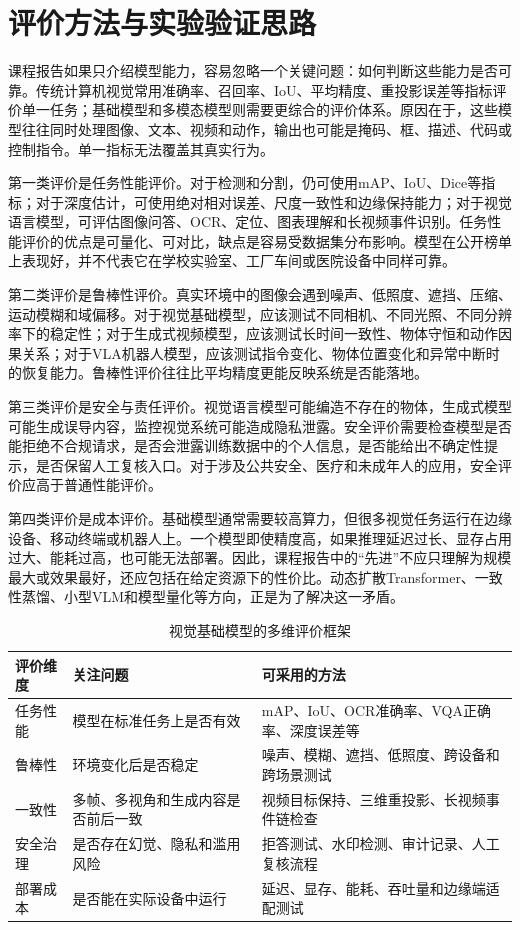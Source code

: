 \documentclass[UTF8,a4paper,12pt]{ctexart}
\begin{document}
\section{评价方法与实验验证思路}
课程报告如果只介绍模型能力，容易忽略一个关键问题：如何判断这些能力是否可靠。传统计算机视觉常用准确率、召回率、IoU、平均精度、重投影误差等指标评价单一任务；基础模型和多模态模型则需要更综合的评价体系。原因在于，这些模型往往同时处理图像、文本、视频和动作，输出也可能是掩码、框、描述、代码或控制指令。单一指标无法覆盖其真实行为。

第一类评价是任务性能评价。对于检测和分割，仍可使用mAP、IoU、Dice等指标；对于深度估计，可使用绝对相对误差、尺度一致性和边缘保持能力；对于视觉语言模型，可评估图像问答、OCR、定位、图表理解和长视频事件识别。任务性能评价的优点是可量化、可对比，缺点是容易受数据集分布影响。模型在公开榜单上表现好，并不代表它在学校实验室、工厂车间或医院设备中同样可靠。

第二类评价是鲁棒性评价。真实环境中的图像会遇到噪声、低照度、遮挡、压缩、运动模糊和域偏移。对于视觉基础模型，应该测试不同相机、不同光照、不同分辨率下的稳定性；对于生成式视频模型，应该测试长时间一致性、物体守恒和动作因果关系；对于VLA机器人模型，应该测试指令变化、物体位置变化和异常中断时的恢复能力。鲁棒性评价往往比平均精度更能反映系统是否能落地。

第三类评价是安全与责任评价。视觉语言模型可能编造不存在的物体，生成式模型可能生成误导内容，监控视觉系统可能造成隐私泄露。安全评价需要检查模型是否能拒绝不合规请求，是否会泄露训练数据中的个人信息，是否能给出不确定性提示，是否保留人工复核入口。对于涉及公共安全、医疗和未成年人的应用，安全评价应高于普通性能评价。

第四类评价是成本评价。基础模型通常需要较高算力，但很多视觉任务运行在边缘设备、移动终端或机器人上。一个模型即使精度高，如果推理延迟过长、显存占用过大、能耗过高，也可能无法部署。因此，课程报告中的“先进”不应只理解为规模最大或效果最好，还应包括在给定资源下的性价比。动态扩散Transformer、一致性蒸馏、小型VLM和模型量化等方向，正是为了解决这一矛盾。

\begin{table}[htbp]
\centering
\small
\caption{视觉基础模型的多维评价框架}
\begin{tabularx}{\textwidth}{C{2.5cm}Y Y}
\toprule
\textbf{评价维度} & \textbf{关注问题} & \textbf{可采用的方法} \\
\midrule
任务性能 & 模型在标准任务上是否有效 & mAP、IoU、OCR准确率、VQA正确率、深度误差等 \\
鲁棒性 & 环境变化后是否稳定 & 噪声、模糊、遮挡、低照度、跨设备和跨场景测试 \\
一致性 & 多帧、多视角和生成内容是否前后一致 & 视频目标保持、三维重投影、长视频事件链检查 \\
安全治理 & 是否存在幻觉、隐私和滥用风险 & 拒答测试、水印检测、审计记录、人工复核流程 \\
部署成本 & 是否能在实际设备中运行 & 延迟、显存、能耗、吞吐量和边缘端适配测试 \\
\bottomrule
\end{tabularx}
\end{table}
\end{document}
